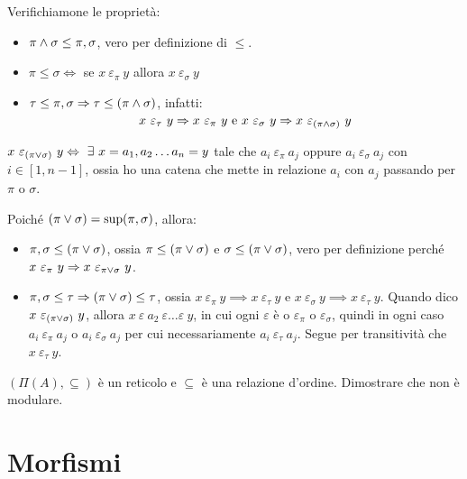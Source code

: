 Verifichiamone le propriet\`a:
\begin{itemize}
  \item $\pi \wedge \sigma \le \pi, \sigma$, vero per definizione di $\le$.
  \item $\pi \le \sigma \iff $ se $ x \ \varepsilon_{\pi} \ y $ allora $x \ \varepsilon_{\sigma} \ y$
  \item $\tau \le \pi, \sigma \Rightarrow \tau \le (\pi \wedge \sigma)$, infatti:
   \[
   x \ \varepsilon_{\tau} \ y \implies 
   x \ \varepsilon_{\pi} \ y \text{ e }
   x \ \varepsilon_{\sigma} \ y 
   \implies x \ \varepsilon_{(\pi \infop \sigma)} \ y
   \]
\end{itemize}

\begin{defn}
$x \ \varepsilon_{(\pi \supop \sigma)} \ y \iff \exists x = a_1, a_2 \dots a_n = y $ tale che $a_i \ \varepsilon_{\pi} \ a_j$ oppure $a_i \ \varepsilon_{\sigma} \ a_j$ con $i \in [1, n-1]$, ossia ho una catena che mette in relazione $a_i$ con $a_j$ passando per $\pi$ o $\sigma$.
\end{defn}

Poich\'e $(\pi \vee \sigma) = \sup (\pi, \sigma)$, allora:
\begin{itemize}
  \item $\pi, \sigma \le (\pi \vee \sigma)$, ossia $\pi \le (\pi \vee \sigma)$ e $\sigma \le (\pi \vee \sigma)$, vero per definizione perch\'e $x \ \varepsilon_{\pi} \ y \implies x \ \varepsilon_{\pi \supop \sigma} \ y$.
  \item $\pi, \sigma \le \tau \Rightarrow (\pi \vee \sigma) \le \tau$, ossia $x \ \varepsilon_{\pi} \ y \implies x \ \varepsilon_{\tau} \ y$ e $x \ \varepsilon_{\sigma} \ y \implies x \ \varepsilon_{\tau} \ y$. Quando dico $x \ \varepsilon_{(\pi \vee \sigma)} \ y$, allora $x \ \varepsilon \ a_2 \ \varepsilon \dots \varepsilon \ y$, in cui ogni $\varepsilon$ \`e o $\varepsilon_{\pi}$ o $\varepsilon_{\sigma}$, quindi in ogni caso $a_i \ \varepsilon_{\pi} \ a_j$ o $a_i \ \varepsilon_{\sigma} \ a_j$ per cui necessariamente $a_i \ \varepsilon_{\tau} \ a_j$. Segue per transitivit\`a che $x \ \varepsilon_{\tau} \ y$.
\end{itemize}

\begin{esercizio}
$(\Pi(A), \subseteq)$ \`e un reticolo e $\subseteq$ \`e una relazione d'ordine. Dimostrare che non \`e modulare.
\end{esercizio}

\section{Morfismi}


